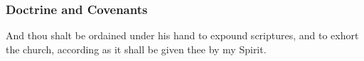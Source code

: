 		
		
	\subsubsection{Doctrine and Covenants} %
		\label{ORDINATION-DC}
	
		
		\begin{compactdesc}
			\item[{\hyperref[DC25-7]{DC 25:7}}] And thou shalt be ordained under his hand to expound scriptures, and to exhort the church, according as it shall be given thee by my Spirit.
		\end{compactdesc}
		
	
		
		

	
